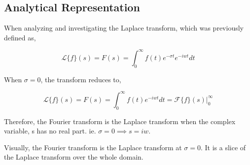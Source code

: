 

\subsection{{Analytical Representation}}

	{When analyzing and investigating the Laplace transform, which was previously defined as,}
	
		$$\mathcal{L}\{f\}(s) = F(s) = \int_0^{\infty}f(t)e^{-\sigma t}e^{-iwt} dt$$	
	
	{When $\sigma = 0$, the transform reduces to,}	
	
		$$\mathcal{L}\{f\}(s) = F(s) = \int_0^{\infty}f(t)e^{-iwt} dt = \left.\mathcal{F}\{f\}(s)\right|_{0}^{\infty}$$

	{Therefore, the Fourier transform is the Laplace transform when the complex variable, s has no real part. ie. $\sigma = 0 \implies s = iw$.}

	{Visually, the Fourier transform is the Laplace transform at $\sigma = 0$. It is a slice of the Laplace transform over the whole domain.}




